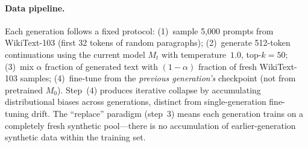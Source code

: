 \begin{table}[t]
\centering
\small
\caption{Metric drift (\%, generation~0$\to$10) for Pythia-410M across contamination levels. Diversity collapse occurs at all $\alpha$ levels, with the strongest decline at low-to-moderate contamination ($\alpha{=}0.25$: distinct-1 $-40.3{\pm}0.3\%$) rather than full replacement ($\alpha{=}1.0$: $-27.8{\pm}1.6\%$). $^\dagger$$\alpha{=}0.10$: single seed (seed~42, preliminary). $\alpha{=}0.00$, $\alpha{=}0.25$, $\alpha{=}0.50$, $\alpha{=}0.75$: 3-seed mean${\pm}$std (seeds 42, 43, 44); $\alpha{=}1.0$: 4-seed mean${\pm}$std (seeds 42, 43, 44, 45).}
\label{tab:drift_summary}
\end{table}

\paragraph{Data pipeline.}
Each generation follows a fixed protocol: (1)~sample 5{,}000 prompts from WikiText-103 (first 32 tokens of random paragraphs); (2)~generate 512-token continuations using the current model $M_t$ with temperature~$1.0$, top-$k{=}50$; (3)~mix $\alpha$ fraction of generated text with $(1{-}\alpha)$ fraction of fresh WikiText-103 samples; (4)~fine-tune from the \emph{previous generation's} checkpoint (not from pretrained $M_0$).
Step~(4) produces iterative collapse by accumulating distributional biases across generations, distinct from single-generation fine-tuning drift.
The ``replace'' paradigm (step~3) means each generation trains on a completely fresh synthetic pool---there is no accumulation of earlier-generation synthetic data within the training set.

